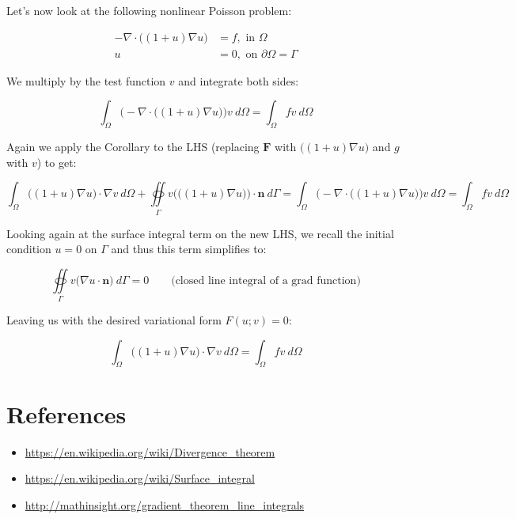 \documentclass[english, 11pt]{article}
\begin{document}
  Let's now look at the following nonlinear Poisson problem: 
  
  \begin{align*}
  	- \nabla \cdot \big( (1 + u) \nabla u \big) &= f , \text{ in } \Omega \\
  	u &= 0 , \text{ on } \partial\Omega = \Gamma
  \end{align*}
  
  We multiply by the test function $v$ and integrate both sides:
  
  \[ \int_{\Omega} \Big( - \nabla \cdot \big( (1 + u) \nabla u \big) \Big) v \ d\Omega = \int_{\Omega} fv \ d\Omega \]
  
  Again we apply the Corollary to the LHS (replacing $\bm{F}$ with $\big( (1 + u) \nabla u \big)$ and $g$ with $v$) to get:
  
  \[ \int_{\Omega} \big( (1 + u) \nabla u \big) \cdot \nabla v \ d\Omega + \oiint \limits_{\Gamma} v \Big( \big( (1 + u) \nabla u \big) \Big) \cdot \bm{n} \ d\Gamma  = \int_{\Omega} \Big( - \nabla \cdot \big( (1 + u) \nabla u \big) \Big) v \ d\Omega = \int_{\Omega} fv \ d\Omega\]
  
  Looking again at the surface integral term on the new LHS, we recall the initial condition $u = 0$ on $\Gamma$ and thus this term simplifies to:
  
  \[ \oiint \limits_{\Gamma} v \big( \nabla u \cdot \bm{n} \big) \ d\Gamma  = 0 \qquad \text{(closed line integral of a grad function)}\]
  
  Leaving us with the desired variational form $F(u;v) = 0$:
  
  \[ \int_{\Omega} \big( (1 + u) \nabla u \big) \cdot \nabla v \ d\Omega = \int_{\Omega} fv \ d\Omega \]
	
	
\newpage	
\section{References}

	\begin{itemize}
		\item \url{https://en.wikipedia.org/wiki/Divergence_theorem}
		\item \url{https://en.wikipedia.org/wiki/Surface_integral}
		\item \url{http://mathinsight.org/gradient_theorem_line_integrals}
	\end{itemize}
	
  
  
\end{document}
